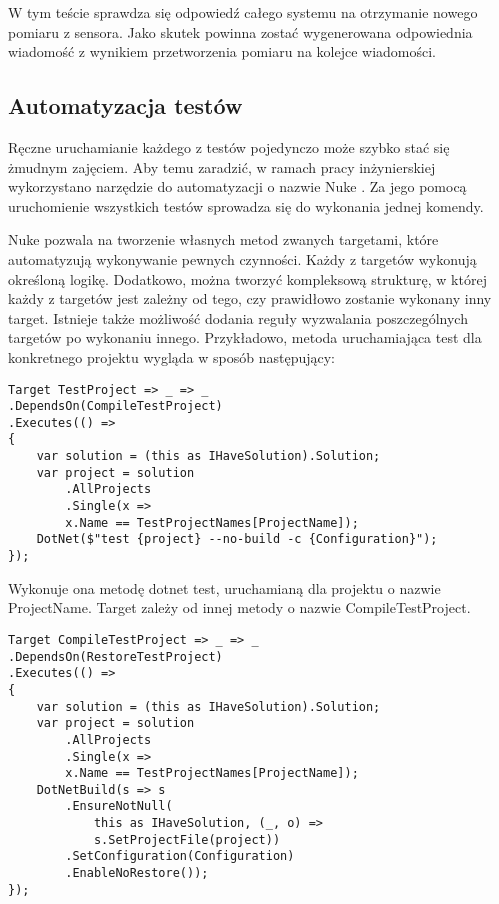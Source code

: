 W tym teście sprawdza się odpowiedź całego systemu na otrzymanie nowego pomiaru 
z sensora. Jako skutek powinna zostać wygenerowana odpowiednia wiadomość z wynikiem 
przetworzenia pomiaru na kolejce wiadomości.

\subsection{Automatyzacja testów}

Ręczne uruchamianie każdego z testów pojedynczo może szybko stać się żmudnym zajęciem. 
Aby temu zaradzić, w ramach pracy inżynierskiej wykorzystano narzędzie do automatyzacji 
o nazwie Nuke \cite{nuke2022}. 
Za jego pomocą uruchomienie wszystkich testów sprowadza się do wykonania 
jednej komendy. 

Nuke pozwala na tworzenie własnych metod zwanych targetami, które automatyzują 
wykonywanie pewnych czynności. Każdy z targetów wykonują określoną logikę. 
Dodatkowo, można tworzyć kompleksową strukturę, w której każdy z targetów jest zależny 
od tego, czy prawidłowo zostanie wykonany inny target. Istnieje także możliwość 
dodania reguły wyzwalania poszczególnych targetów po wykonaniu innego. 
Przykładowo, metoda uruchamiająca test dla konkretnego projektu wygląda w sposób 
następujący:

\begin{lstlisting}
Target TestProject => _ => _
.DependsOn(CompileTestProject)
.Executes(() =>
{
    var solution = (this as IHaveSolution).Solution;
    var project = solution
        .AllProjects
        .Single(x => 
        x.Name == TestProjectNames[ProjectName]);
    DotNet($"test {project} --no-build -c {Configuration}");
});
\end{lstlisting}

Wykonuje ona metodę dotnet test, uruchamianą dla projektu o nazwie ProjectName. 
Target zależy od innej metody o nazwie CompileTestProject.

\begin{lstlisting}
Target CompileTestProject => _ => _
.DependsOn(RestoreTestProject)
.Executes(() =>
{
    var solution = (this as IHaveSolution).Solution;
    var project = solution
        .AllProjects
        .Single(x => 
        x.Name == TestProjectNames[ProjectName]);
    DotNetBuild(s => s
        .EnsureNotNull(
            this as IHaveSolution, (_, o) => 
            s.SetProjectFile(project))
        .SetConfiguration(Configuration)
        .EnableNoRestore());
});
\end{lstlisting}

